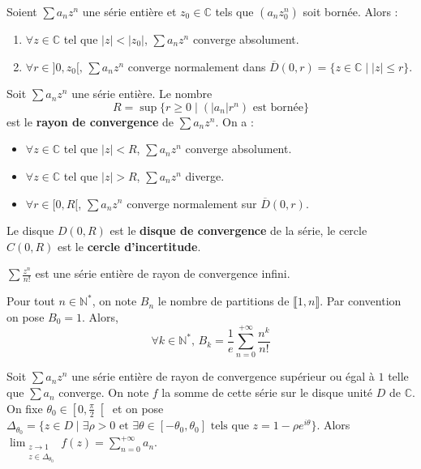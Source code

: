   \begin{lemma}[Abel]
    Soient $\sum a_n z^n$ une série entière et $z_0 \in \mathbb{C}$ tels que $(a_n z_0^n)$ soit bornée. Alors :
    \begin{enumerate}[label=(\roman*)]
      \item $\forall z \in \mathbb{C}$ tel que $|z| < |z_0|$, $\sum a_n z^n$ converge absolument.
      \item $\forall r \in ]0,z_0[, \, \sum a_n z^n$ converge normalement dans $\overline{D}(0, r) = \{ z \in \mathbb{C} \mid |z| \leq r \}$.
    \end{enumerate}
  \end{lemma}

  \begin{definition}
    Soit $\sum a_n z^n$ une série entière. Le nombre
    \[ R = \sup \{ r \geq 0 \mid (|a_n|r^n) \text{ est bornée} \} \]
    est le \textbf{rayon de convergence} de $\sum a_n z^n$. On a :
    \begin{itemize}
      \item $\forall z \in \mathbb{C}$ tel que $|z| < R$, $\sum a_n z^n$ converge absolument.
      \item $\forall z \in \mathbb{C}$ tel que $|z| > R$, $\sum a_n z^n$ diverge.
      \item $\forall r \in [0,R[$, $\sum a_n z^n$ converge normalement sur $\overline{D}(0,r)$.
    \end{itemize}
    Le disque $D(0,R)$ est le \textbf{disque de convergence} de la série, le cercle $C(0,R)$ est le \textbf{cercle d'incertitude}.
  \end{definition}

  \begin{example}
    $\sum \frac{z^n}{n!}$ est une série entière de rayon de convergence infini.
  \end{example}


  \begin{theorem}
    Pour tout $n \in \mathbb{N}^*$, on note $B_n$ le nombre de partitions de $\llbracket 1, n \rrbracket$. Par convention on pose $B_0 = 1$. Alors,
    \[ \forall k \in \mathbb{N}^*, \, B_k = \frac{1}{e} \sum_{n=0}^{+\infty} \frac{n^k}{n!} \]
  \end{theorem}


  \begin{theorem}
    \label{230-1}
    Soit $\sum a_n z^n$ une série entière de rayon de convergence supérieur ou égal à $1$ telle que $\sum a_n$ converge. On note $f$ la somme de cette série sur le disque unité $D$ de $\mathbb{C}$. On fixe $\theta_0 \in \left[ 0, \frac{\pi}{2} \right[$ et on pose $\Delta_{\theta_0} = \{ z \in D \mid \exists \rho > 0 \text{ et } \exists \theta \in [-\theta_0, \theta_0] \text{ tels que } z = 1 - \rho e^{i\theta} \}$.
    \newpar
    Alors $\lim_{\substack{z \rightarrow 1 \\ z \in \Delta_{\theta_0}}} f(z) = \sum_{n=0}^{+\infty} a_n$.
  \end{theorem}

